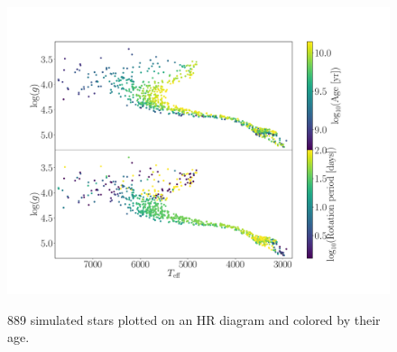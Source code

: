 \begin{figure}
  \caption{
889 simulated stars plotted on an HR diagram and colored by their age.
}
  \centering
    \includegraphics[width=1\textwidth]{simulated_CMD}
\label{fig:CMD_age}
\end{figure}


